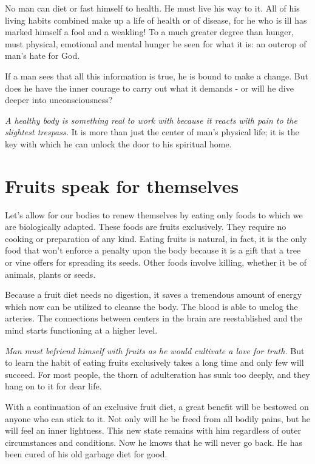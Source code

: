 \documentclass[landscape,twocolumn,letterpaper]{article}
\begin{document}
No man can diet or fast himself to health. He must live his way to
it. All of his living habits combined make up a life of health or of
disease, for he who is ill has marked himself a fool and a weakling!
To a much greater degree than hunger, must physical, emotional and
mental hunger be seen for what it is: an outcrop of man's hate for
God.

If a man sees that all this information is true, he is bound to make a
change. But does he have the inner courage to carry out what it
demands - or will he dive deeper into unconsciousness?

\emph{A healthy body is something real to work with because it reacts
  with pain 
to the slightest trespass.} It is more than just the center of man's
physical life; it is the key with which he can unlock the door to his
spiritual home.

\section{Fruits speak for themselves}

Let's allow for our bodies to renew themselves by eating only foods to
which we are biologically adapted. These foods are fruits
exclusively. They require no cooking or preparation of any
kind. Eating fruits is natural, in fact, it is the only food that
won't enforce a penalty upon the body because it is a gift that a tree
or vine offers for spreading its seeds. Other foods involve killing,
whether it be of animals, plants or seeds.

Because a fruit diet needs no digestion, it saves a tremendous amount
of energy which now can be utilized to cleanse the body. The blood is
able to unclog the arteries. The connections between centers in the
brain are reestablished and the mind starts functioning at a higher
level.

\emph{Man must befriend himself with fruits as he would cultivate a
love for truth.} But to learn the habit of eating fruits exclusively
takes a long time and only few will succeed. For most people, the
thorn of adulteration has sunk too deeply, and they hang on to it for
dear life.

With a continuation of an exclusive fruit diet, a great benefit will
be bestowed on anyone who can stick to it. Not only will he be freed
from all bodily pains, but he will feel an inner lightness. This new
state remains with him regardless of outer circumstances and
conditions. Now he knows that he will never go back. He has been cured
of his old garbage diet for good.
\end{document}
